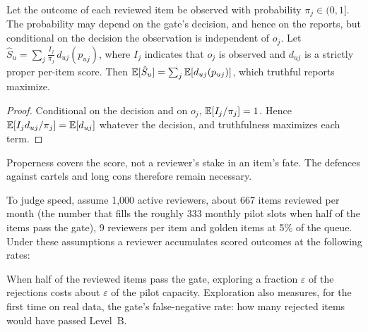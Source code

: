 \begin{proposition}\label{prop:ipw}\proved{}
Let the outcome of each reviewed item be observed with probability $\pi_j\in(0,1]$. The
probability may depend on the gate's decision, and hence on the reports, but conditional on the
decision the observation is independent of $o_j$. Let
$\hat S_u=\sum_j\frac{I_j}{\pi_j}\,d_{uj}(p_{uj})$, where $I_j$ indicates that $o_j$ is observed
and $d_{uj}$ is a strictly proper per-item score. Then
$\mathbb{E}[\hat S_u]=\sum_j\mathbb{E}[d_{uj}(p_{uj})]$, which truthful reports maximize.
\end{proposition}
\begin{proof}
Conditional on the decision and on $o_j$, $\mathbb{E}[I_j/\pi_j]=1$. Hence
$\mathbb{E}[I_jd_{uj}/\pi_j]=\mathbb{E}[d_{uj}]$ whatever the decision, and truthfulness maximizes each term.
\end{proof}

Properness covers the score, not a reviewer's stake in an item's fate. The defences against
cartels and long cons therefore remain necessary.

To judge speed, assume 1{,}000 active reviewers, about 667 items reviewed per month (the number
that fills the roughly 333 monthly pilot slots when half of the items pass the gate), 9 reviewers
per item and golden items at 5\% of the queue. Under these assumptions a reviewer accumulates
scored outcomes at the following rates:

\begin{center}\small
{}
\end{center}

When half of the reviewed items pass the gate, exploring a fraction $\varepsilon$ of the rejections
costs about $\varepsilon$ of the pilot capacity. Exploration also measures, for the first time on
real data, the gate's false-negative rate: how many rejected items would have passed Level~B.

